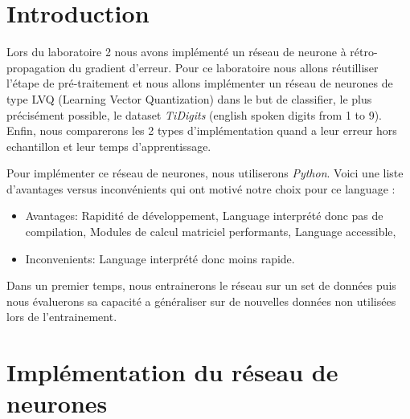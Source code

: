 \documentclass[11pt]{article}
\begin{document}
\EtsPageGenerate
\tableofcontents

\newpage
\section{Introduction}
Lors du laboratoire 2 nous avons impl\'ement\'e un r\'eseau de neurone \`a
r\'etro-propagation du gradient d’erreur. Pour ce laboratoire nous allons
r\'eutilliser l'étape de pré-traitement et nous allons implémenter un r\'eseau
de neurones de type LVQ (Learning Vector Quantization) dans le but de
classifier, le plus précisément possible, le dataset {\em TiDigits} (english
spoken digits from 1 to 9). Enfin, nous comparerons les 2 types
d'impl\'ementation quand a leur erreur hors echantillon et leur temps
d'apprentissage.

Pour implémenter ce r\'eseau de neurones, nous utiliserons {\em Python}.
Voici une liste d'avantages versus inconv\'enients qui ont motiv\'e notre choix
pour ce language :
\begin{itemize}
	\item Avantages:
		\subitem Rapidit\'e de d\'eveloppement,
		\subitem Language interpr\'et\'e donc pas de compilation,
		\subitem Modules de calcul matriciel performants,
		\subitem Language accessible,
	\item Inconvenients:
		\subitem Language interpr\'et\'e donc moins rapide. \\
\end{itemize}

Dans un premier temps, nous entrainerons le r\'eseau sur un set de donn\'ees puis
nous \'evaluerons sa capacit\'e a g\'en\'eraliser sur de nouvelles donn\'ees
non utilis\'ees lors de l'entrainement.
\section{Impl\'ementation du r\'eseau de neurones}
\end{document}
